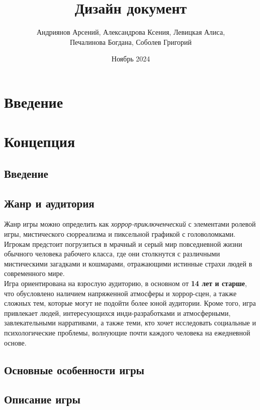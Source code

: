\documentclass{article}
\title{Дизайн документ}
\author{Андриянов Арсений, Александрова Ксения, Левицкая Алиса, \\ Печалинова Богдана, Соболев Григорий}
\date{Ноябрь 2024}
\begin{document}
	
	\maketitle
	
	\tableofcontents
	
	\newpage
	\section{Введение}
	
	\newpage
	\section{Концепция}
	
	\subsection{Введение}
	
	\newpage
	\subsection{Жанр и аудитория}    
	Жанр игры можно определить как \textit{хоррор-приключенческий} с элементами ролевой игры, мистического сюрреализма и пиксельной графикой с головоломками. Игрокам предстоит погрузиться в мрачный и серый мир повседневной жизни обычного человека рабочего класса, где они столкнутся с различными мистическими загадками и кошмарами, отражающими истинные страхи людей в современного мире. \\  
    
        Игра ориентирована на взрослую аудиторию, в основном от \textbf{14 
    лет и старше}, что обусловлено наличием напряженной атмосферы и хоррор-сцен, а также сложных тем, которые могут не подойти более юной аудитории. Кроме того, игра привлекает людей, интересующихся инди-разработками и атмосферными, завлекательными нарративами, а также теми, кто хочет исследовать социальные и психологические проблемы, волнующие почти каждого человека на ежедневной основе. \\
	
	\newpage
	\subsection{Основные особенности игры}
	
	\newpage
	\subsection{Описание игры}
	
\end{document}
